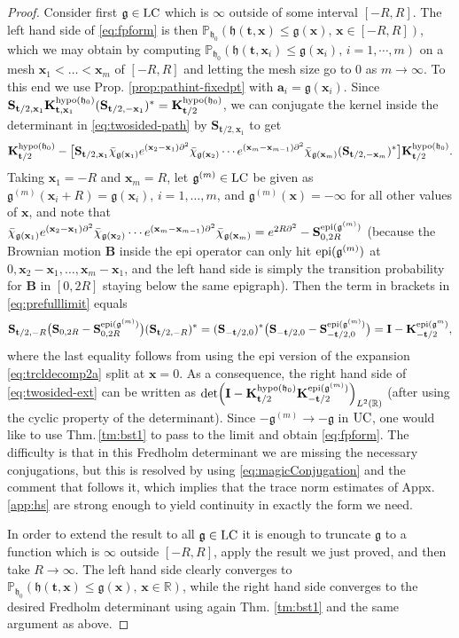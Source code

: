 \documentclass[letterpaper,reqno,11pt,oneside,final]{amsart}
\theoremstyle{definition}
\newcommand{\fh}{\mathfrak{h}}
\newcommand{\fg}{\mathfrak{g}}
\newcommand{\pp}{\mathbb{P}}
\newcommand{\rr}{\mathbb{R}}
\newcommand{\p}{\partial}
\newcommand{\uptext}[1]{\text{\upshape{#1}}}
\DeclareMathOperator{\epi}{\uptext{epi}}
\DeclareMathOperator{\hypo}{\uptext{hypo}}
\DeclareMathOperator{\UC}{\uptext{UC}}
\DeclareMathOperator{\LC}{\uptext{LC}}
\newcommand{\fT}{\mathbf{S}}
\newcommand{\ft}{\mathbf{t}}
\newcommand{\fx}{\mathbf{x}}
\newcommand{\fa}{\mathbf{a}}
\newcommand{\fB}{\mathbf{B}}
\newcommand{\fK}{\mathbf{K}}
\newcommand{\fI}{\mathbf{I}}
\renewcommand{\P}{\chi}
\numberwithin{equation}{section}
\begin{document}
\begin{proof}
Consider first $\fg\in\LC$ which is $\infty$ outside of some interval $[-R,R]$.
The left hand side of \eqref{eq:fpform} is then $\pp_{\fh_0}( \fh(\ft, \fx) \le \fg(\fx),\,\fx\in[-R,R])$, which we may obtain by computing $\pp_{\fh_0}( \fh(\ft, \fx_i) \le \fg(\fx_i),\,i=1,\dotsm,m)$ on a mesh $\fx_1<\dotsc<\fx_m$ of $[-R,R]$ and letting the mesh size go to $0$ as $m\to\infty$.
To this end we use Prop. \ref{prop:pathint-fixedpt} with $\fa_i=\fg(\fx_i)$.
Since $\fT_{\ft/2,\fx_1}\fK^{\hypo(\fh_0)}_{\ft,\fx_1}(\fT_{\ft/2,-\fx_1})^*=\fK^{\hypo(\fh_0)}_{\ft/2}$, we can conjugate the kernel inside the determinant in \eqref{eq:twosided-path} by $\fT_{\ft/2,\fx_1}$ to get
\begin{equation}
\fK^{\hypo(\fh_0)}_{\ft/2}-\big[\fT_{\ft/2,\fx_1}\bar\P_{\fg(\fx_1)}e^{(\fx_2-\fx_1)\p^2}\bar\P_{\fg(\fx_2)}\dotsm e^{(\fx_m-\fx_{m-1})\p^2}\bar\P_{\fg(\fx_m)}(\fT_{\ft/2,-\fx_m})^*\big]\fK^{\hypo(\fh_0)}_{\ft/2}.\label{eq:prefulllimit}
\end{equation}
Taking $\fx_1=-R$ and $\fx_m=R$, let $\fg^{(m)}\in\LC$ be given as $\fg^{(m)}(\fx_i+R)=\fg(\fx_i)$, $i=1,\dotsc,m$, and $\fg^{(m)}(\fx)=-\infty$ for all other values of $\fx$, and note that $\bar\P_{\fg(\fx_1)}e^{(\fx_2-\fx_1)\p^2}\bar\P_{\fg(\fx_2)}\dotsm e^{(\fx_m-\fx_{m-1})\p^2}\bar\P_{\fg(\fx_m)}=e^{2R\p^2}-\fT^{\epi(\fg^{(m)})}_{0,2R}$ (because the Brownian motion $\fB$ inside the epi operator can only hit $\epi(\fg^{(m)})$ at $0,\fx_2-\fx_1,\dotsc,\fx_m-\fx_1$, and the left hand side is simply the transition probability for $\fB$ in $[0,2R]$ staying below the same epigraph).
Then the term in brackets in \eqref{eq:prefulllimit} equals 
\[\fT_{\ft/2,-R}\big(\fT_{0,2R}-\fT^{\epi(\fg^{(m)})}_{0,2R}\big)(\fT_{\ft/2,-R})^*=(\fT_{-\ft/2,0})^*\big(\fT_{-\ft/2,0}-\fT^{\epi(\fg^{(m)})}_{-\ft/2,0}\big)=\fI-\fK^{\epi(\fg^{m})}_{-\ft/2},\] 
where the last equality follows from using the epi version of the expansion \eqref{eq:trcldecomp2a} split at $\fx=0$.
As a consequence, the right hand side of  \eqref{eq:twosided-ext} can be written as $\det\!\left(\fI-\fK^{\hypo(\fh_0)}_{\ft/2}\fK^{\epi(\fg^{(m)})}_{-\ft/2}\right)_{L^2(\rr)}$ (after using the cyclic property of the determinant).
Since $-\fg^{(m)}\to -\fg$ in $\UC$, one would like to use Thm.\,\ref{tm:bst1} to pass to the limit and obtain \eqref{eq:fpform}.
The difficulty is that in this Fredholm determinant we are missing the necessary conjugations, but this is resolved by using \eqref{eq:magicConjugation} and the comment that follows it, which implies that the trace norm estimates of Appx. \ref{app:hs} are strong enough to yield continuity in exactly the form we need.

In order to extend the result to all $\fg\in\LC$ it is enough to truncate $\fg$ to a function which is $\infty$ outside $[-R,R]$, apply the result we just proved, and then take $R\to\infty$.
The left hand side clearly converges to $\pp_{\fh_0}( \fh(\ft, \fx) \le \fg(\fx),\,\fx\in\rr)$, while the right hand side converges to the desired Fredholm determinant using again Thm. \ref{tm:bst1} and the same argument as above.
\end{proof}
\end{document}
